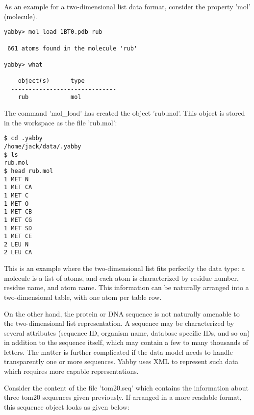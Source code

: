 As an example for a two-dimensional list data format, consider the
property 'mol' (molecule).

\begin{verbatim}
yabby> mol_load 1BT0.pdb rub

 661 atoms found in the molecule 'rub'

yabby> what

    object(s)      type
  ------------------------------
    rub            mol           
\end{verbatim}

The command 'mol\_load' has created the object 'rub.mol'. This object
is stored in the workspace as the file 'rub.mol':

\begin{verbatim}
$ cd .yabby
/home/jack/data/.yabby
$ ls
rub.mol
$ head rub.mol
1 MET N 
1 MET CA 
1 MET C 
1 MET O 
1 MET CB 
1 MET CG 
1 MET SD 
1 MET CE 
2 LEU N 
2 LEU CA 
\end{verbatim}

This is an example where the two-dimensional list fits perfectly
the data type: a molecule is a list of atoms, and each atom is
characterized by residue number, residue name, and atom name.
This information can be naturally arranged into a two-dimensional
table, with one atom per table row. 

On the other hand, the protein or DNA sequence is not naturally
amenable to the two-dimensional list representation. A sequence
may be characterized by several attributes (sequence ID, organism
name, database specific IDs, and so on) in addition to the sequence
itself, which may contain a few to many thousands of letters. The
matter is further complicated if the data model needs to handle
transparently one or more sequences. Yabby uses XML to represent
such data which requires more capable representations.

Consider the content of the file 'tom20.seq' which contains
the information about three tom20 sequences given previously.
If arranged in a more readable format, this sequence object
looks as given below:

